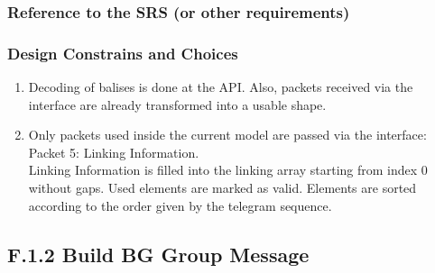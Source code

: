 \documentclass{template/openetcs_report}
\begin{document}
\subsubsection{Reference to the SRS (or other requirements)}

\subsubsection{Design Constrains and Choices}

\begin{enumerate}
\item Decoding of balises is done at the API. Also, packets received via the interface are already transformed into a usable shape.
\item Only packets used inside the current model are passed via the interface:\\
Packet 5: Linking Information.\\
Linking Information is filled into the linking array starting from index 0 without gaps. Used elements are marked as valid. Elements are sorted according to the order given by the telegram sequence.
\end{enumerate}



\subsection{F.1.2 Build BG Group Message}
\end{document}
